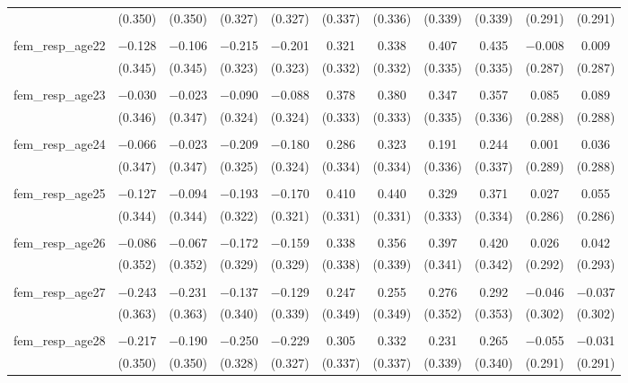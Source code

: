 \begin{table}[!htbp]
\begin{tabular}{@{\extracolsep{5pt}}lcccccccccc}
  & (0.350) & (0.350) & (0.327) & (0.327) & (0.337) & (0.336) & (0.339) & (0.339) & (0.291) & (0.291) \\ 
  & & & & & & & & & & \\ 
 fem\_resp\_age22 & $-$0.128 & $-$0.106 & $-$0.215 & $-$0.201 & 0.321 & 0.338 & 0.407 & 0.435 & $-$0.008 & 0.009 \\ 
  & (0.345) & (0.345) & (0.323) & (0.323) & (0.332) & (0.332) & (0.335) & (0.335) & (0.287) & (0.287) \\ 
  & & & & & & & & & & \\ 
 fem\_resp\_age23 & $-$0.030 & $-$0.023 & $-$0.090 & $-$0.088 & 0.378 & 0.380 & 0.347 & 0.357 & 0.085 & 0.089 \\ 
  & (0.346) & (0.347) & (0.324) & (0.324) & (0.333) & (0.333) & (0.335) & (0.336) & (0.288) & (0.288) \\ 
  & & & & & & & & & & \\ 
 fem\_resp\_age24 & $-$0.066 & $-$0.023 & $-$0.209 & $-$0.180 & 0.286 & 0.323 & 0.191 & 0.244 & 0.001 & 0.036 \\ 
  & (0.347) & (0.347) & (0.325) & (0.324) & (0.334) & (0.334) & (0.336) & (0.337) & (0.289) & (0.288) \\ 
  & & & & & & & & & & \\ 
 fem\_resp\_age25 & $-$0.127 & $-$0.094 & $-$0.193 & $-$0.170 & 0.410 & 0.440 & 0.329 & 0.371 & 0.027 & 0.055 \\ 
  & (0.344) & (0.344) & (0.322) & (0.321) & (0.331) & (0.331) & (0.333) & (0.334) & (0.286) & (0.286) \\ 
  & & & & & & & & & & \\ 
 fem\_resp\_age26 & $-$0.086 & $-$0.067 & $-$0.172 & $-$0.159 & 0.338 & 0.356 & 0.397 & 0.420 & 0.026 & 0.042 \\ 
  & (0.352) & (0.352) & (0.329) & (0.329) & (0.338) & (0.339) & (0.341) & (0.342) & (0.292) & (0.293) \\ 
  & & & & & & & & & & \\ 
 fem\_resp\_age27 & $-$0.243 & $-$0.231 & $-$0.137 & $-$0.129 & 0.247 & 0.255 & 0.276 & 0.292 & $-$0.046 & $-$0.037 \\ 
  & (0.363) & (0.363) & (0.340) & (0.339) & (0.349) & (0.349) & (0.352) & (0.353) & (0.302) & (0.302) \\ 
  & & & & & & & & & & \\ 
 fem\_resp\_age28 & $-$0.217 & $-$0.190 & $-$0.250 & $-$0.229 & 0.305 & 0.332 & 0.231 & 0.265 & $-$0.055 & $-$0.031 \\ 
  & (0.350) & (0.350) & (0.328) & (0.327) & (0.337) & (0.337) & (0.339) & (0.340) & (0.291) & (0.291) \\ 

\end{tabular}
\end{table}

